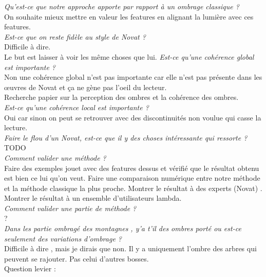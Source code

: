 \documentclass[a4paper]{article}
\begin{document}
\textit{Qu'est-ce que notre approche apporte par rapport à un ombrage classique ? }\\
On souhaite mieux mettre en valeur les features en alignant la lumière avec ces features.  \\
\textit{Est-ce que on reste fidèle au style de Novat ?}\\
Difficile à dire.\\
Le but est laisser à voir les même choses que lui.
\textit{Est-ce qu'une cohérence global est importante ? }\\
 Non une cohérence global n'est pas importante car elle n'est pas présente dans les œuvres de Novat et ça ne gène pas l'oeil du lecteur. \\
 Recherche papier sur la perception des ombres et la cohérence des ombres. \\
\textit{Est-ce qu'une cohérence local est importante ? }\\
Oui car sinon on peut se retrouver avec des discontinuités non voulue qui casse la lecture.\\
\textit{Faire le flou d'un Novat, est-ce que il y des choses intéressante qui ressorte ? }\\
TODO \\
\textit{Comment valider une méthode ? }\\
Faire des exemples jouet avec des features dessus et vérifié que le résultat obtenu est bien ce lui qu'on veut. Faire une comparaison numérique entre notre méthode et la méthode classique la plus proche. Montrer le résultat à des experts (Novat) . Montrer le résultat à un ensemble d'utilisateurs lambda. \\
\textit{Comment valider une partie de méthode ? }\\
?\\
\textit{Dans les partie ombragé des montagnes , y'a t'il des ombres porté ou est-ce seulement des variations d'ombrage ? }\\
Difficile à dire , mais je dirais que non. Il y a uniquement l'ombre des arbres qui peuvent se rajouter. Pas celui d'autres bosses. \\ 





Question levier : 
\end{document}

